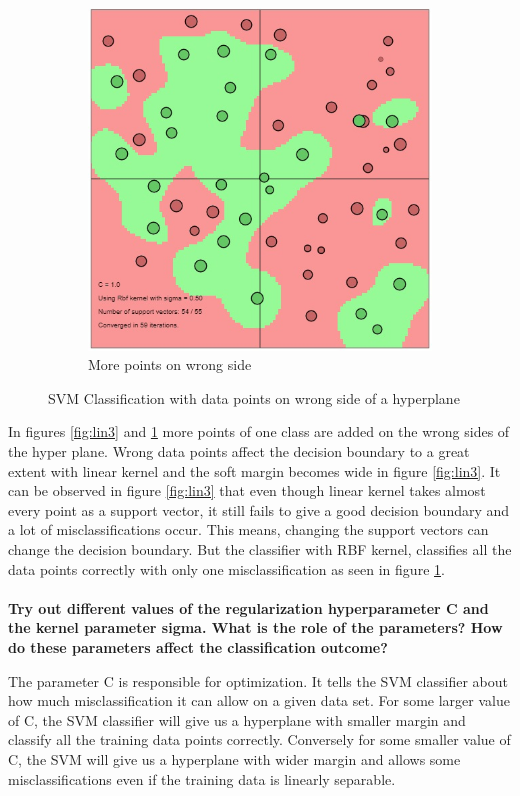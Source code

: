 {\begin{figure}[ht]
\begin{subfigure}{.3\textwidth}
 			\includegraphics[width=.7\linewidth]{Exercise1/Report/RBF_kernel_3.jpg}
 			\caption{More points on wrong side}
 			\label{fig:rbf3}
 		\end{subfigure}
	 	\caption{SVM Classification with data points on wrong side of a hyperplane}
	 	\label{fig:lin_rbf2}
	\end{figure}
 
    
In figures \ref{fig:lin3} and \ref{fig:rbf3} more points of one class are added on the wrong sides of the hyper plane. Wrong data points affect the decision boundary to a great extent with linear kernel and the soft margin becomes wide in figure \ref{fig:lin3}. It can be observed in figure \ref{fig:lin3} that even though linear kernel takes almost every point as a support vector, it still fails to give a good decision boundary and a lot of misclassifications occur. This means, changing the support vectors can change the decision boundary. But the classifier with RBF kernel, classifies all the data points correctly with only one misclassification as seen in figure \ref{fig:rbf3}. \\\\
\textbf{Try out different values of the regularization hyperparameter C and the kernel parameter sigma. What is the role of the parameters? How do these parameters
affect the classification outcome?}
 
 The parameter C is responsible for optimization. It tells the SVM classifier about how much misclassification it can allow on a given data set. For some larger value of C, the SVM classifier will give us a hyperplane with smaller margin and classify all the training data points correctly. Conversely for some smaller value of C, the SVM will give us a hyperplane with wider margin and allows some misclassifications even if the training data is linearly separable.

}
